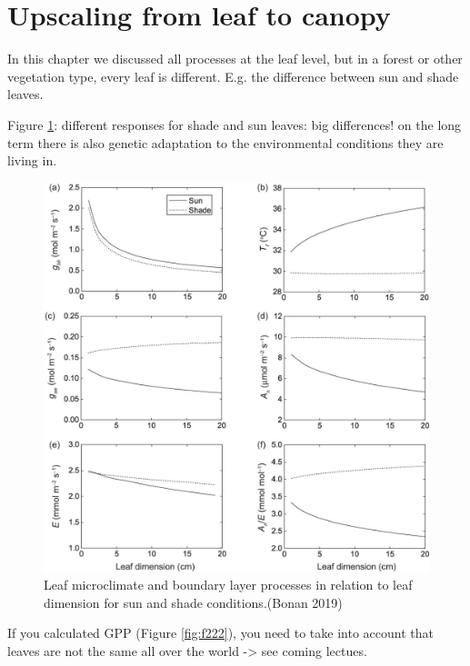 \documentclass[
  12pt,
  oneside]{book}
\begin{document}
\hypertarget{upscaling-from-leaf-to-canopy}{%
\section{Upscaling from leaf to canopy}\label{upscaling-from-leaf-to-canopy}}

In this chapter we discussed all processes at the leaf level, but in a forest or other vegetation type, every leaf is different. E.g. the difference between sun and shade leaves.

Figure \ref{fig:f221}: different responses for shade and sun leaves: big differences!
on the long term there is also genetic adaptation to the environmental conditions they are living in.

\begin{figure}

{\centering \includegraphics[width=0.8\linewidth]{figures/chap2/sun_shade} 

}

\caption{Leaf microclimate and boundary layer processes in relation to leaf dimension for sun and shade conditions.(Bonan 2019)}\label{fig:f221}
\end{figure}

If you calculated GPP (Figure \ref{fig:f222}), you need to take into account that leaves are not the same all over the world -\textgreater{} see coming lectues.
\end{document}

